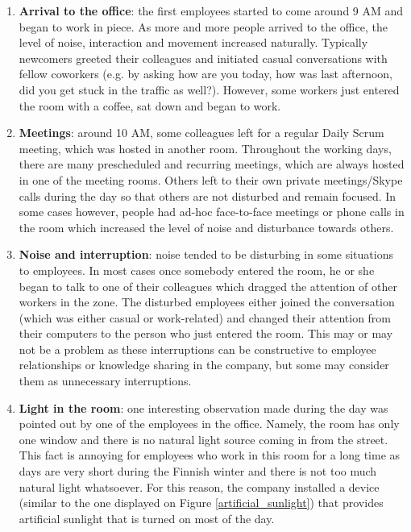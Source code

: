 \begin{enumerate}
	\item \textbf{Arrival to the office}: the first employees started to come around 9 AM and began to work in piece. As more and more people arrived to the office, the level of noise, interaction and movement increased naturally. Typically newcomers greeted their colleagues and initiated casual conversations with fellow coworkers (e.g. by asking how are you today, how was last afternoon, did you get stuck in the traffic as well?). However, some workers just entered the room with a coffee, sat down and began to work. 
	\item \textbf{Meetings}: around 10 AM, some colleagues left for a regular Daily Scrum meeting, which was hosted in another room. Throughout the working days, there are many prescheduled and recurring meetings, which are always hosted in one of the meeting rooms. Others left to their own private meetings/Skype calls during the day so that others are not disturbed and remain focused. In some cases however, people had ad-hoc face-to-face meetings or phone calls in the room which increased the level of noise and disturbance towards others.
	\item \textbf{Noise and interruption}: noise tended to be disturbing in some situations to employees. In most cases once somebody entered the room, he or she began to talk to one of their colleagues which dragged the attention of other workers in the zone. The disturbed employees either joined the conversation (which was either casual or work-related) and changed their attention from their computers to the person who just entered the room. This may or may not be a problem as these interruptions can be constructive to employee relationships or knowledge sharing in the company, but some may consider them as unnecessary interruptions. 	
	\item \textbf{Light in the room}: one interesting observation made during the day was pointed out by one of the employees in the office. Namely, the room has only one window and there is no natural light source coming in from the street. This fact is annoying for employees who work in this room for a long time as days are very short during the Finnish winter and there is not too much natural light whatsoever. For this reason, the company installed a device (similar to the one displayed on Figure \ref{artificial_sunlight}) that provides artificial sunlight that is turned on most of the day. 
	

\end{enumerate}
